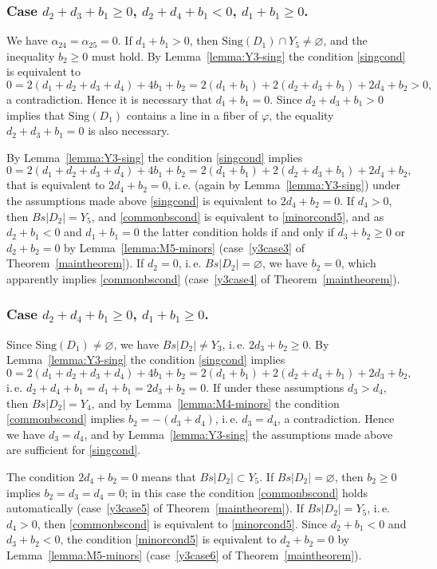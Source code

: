 \documentclass[12pt]{amsart}
\theoremstyle{definition}
\theoremstyle{remark}
\begin{document}
\subsubsection{Case $d_2+d_3+b_1\geqslant 0$, $d_2+d_4+b_1<0$, $d_1+b_1\geqslant 0$.} 
We have $\alpha_{24}=\alpha_{25}=0$. If $d_1+b_1>0$, then 
${\mathrm{Sing}}(D_1)\cap Y_5\neq\varnothing$, and the inequality 
$b_2\geqslant 0$ must hold. 
By Lemma~\ref{lemma:Y3-sing} the condition \ref{singcond} is equivalent to
$$0=2(d_1+d_2+d_3+d_4)+4b_1+b_2=2(d_1+b_1)+2(d_2+d_3+b_1)+2d_4+b_2>0,$$
a contradiction. Hence it is necessary that $d_1+b_1=0$. Since $d_2+d_3+b_1>0$
implies that ${\mathrm{Sing}}(D_1)$ contains a line in a fiber of $\varphi$, 
the equality $d_2+d_3+b_1=0$ is also necessary.

By Lemma~\ref{lemma:Y3-sing} the condition \ref{singcond} implies
$$0=2(d_1+d_2+d_3+d_4)+4b_1+b_2=2(d_1+b_1)+2(d_2+d_3+b_1)+2d_4+b_2,$$
that is equivalent to $2d_4+b_2=0$, i.\,e. (again by Lemma~\ref{lemma:Y3-sing})
under the assumptions made above \ref{singcond} is equivalent to $2d_4+b_2=0$.
If $d_4>0$, then $Bs|D_2|=Y_5$, and \ref{commonbscond} is equivalent to 
\ref{minorcond5}, and as $d_2+b_1<0$ and $d_1+b_1=0$ the latter condition 
holds if and only if $d_3+b_2\geqslant 0$ or
$d_2+b_2=0$ by Lemma~\ref{lemma:M5-minors} 
(case~\ref{y3case3} of Theorem~\ref{maintheorem}). 
If $d_2=0$, i.\,e. $Bs|D_2|=\varnothing$, we have $b_2=0$, which apparently
implies \ref{commonbscond} (case~\ref{y3case4} 
of Theorem~\ref{maintheorem}).

\subsubsection{Case $d_2+d_4+b_1\geqslant 0$, $d_1+b_1\geqslant 0$.} 
Since ${\mathrm{Sing}}(D_1)\neq\varnothing$,
we have $Bs|D_2|\neq Y_3$, i.\,e. $2d_3+b_2\geqslant 0$. 
By Lemma~\ref{lemma:Y3-sing} the condition \ref{singcond} implies 
$$0=2(d_1+d_2+d_3+d_4)+4b_1+b_2=2(d_1+b_1)+2(d_2+d_4+b_1)+2d_3+b_2,$$
i.\,e. $d_2+d_4+b_1=d_1+b_1=2d_3+b_2=0$. If under these assumptions $d_3>d_4$, 
then $Bs|D_2|=Y_4$, and by Lemma~\ref{lemma:M4-minors} the condition 
\ref{commonbscond} implies $b_2=-(d_3+d_4)$, i.\,e. $d_3=d_4$, a contradiction.
Hence we have $d_3=d_4$, and by Lemma~\ref{lemma:Y3-sing} the assumptions made 
above are sufficient for \ref{singcond}. 

The condition $2d_4+b_2=0$ means that $Bs|D_2|\subset Y_5$. 
If $Bs|D_2|=\varnothing$, then $b_2\geqslant 0$ implies $b_2=d_3=d_4=0$;
in this case the condition \ref{commonbscond} holds automatically
(case~\ref{y3case5} of Theorem~\ref{maintheorem}). If $Bs|D_2|=Y_5$,
i.\,e. $d_4>0$, then \ref{commonbscond} is equivalent to \ref{minorcond5}. 
Since $d_2+b_1<0$ and
$d_3+b_2<0$, the condition \ref{minorcond5} is equivalent to $d_2+b_2=0$ 
by Lemma~\ref{lemma:M5-minors} (case~\ref{y3case6} 
of Theorem~\ref{maintheorem}).
\end{document}
